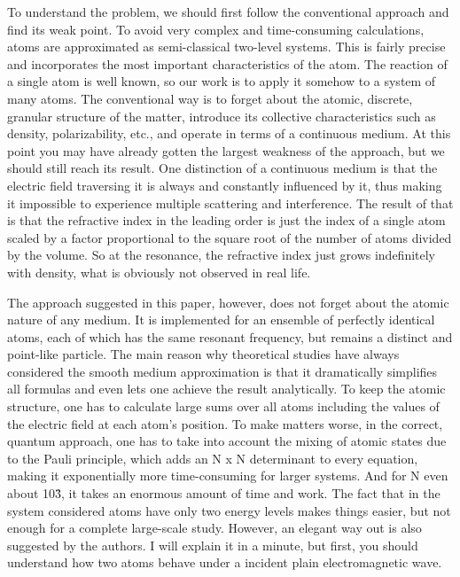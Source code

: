 \documentclass[a4paper, 12pt]{article}
\begin{document}
To understand the problem, we should first follow the conventional 
approach and find its weak point. To avoid very complex and 
time-consuming calculations, atoms are approximated as semi-classical 
two-level systems. This is fairly precise and incorporates the most 
important characteristics of the atom. The reaction of a single atom is 
well known, so our work is to apply it somehow to a system of many 
atoms. The conventional way is to forget about the atomic, discrete, 
granular structure of the matter, introduce its collective 
characteristics such as density, polarizability, etc., and operate in 
terms of a continuous medium. At this point you may have already gotten 
the largest weakness of the approach, but we should still reach its 
result. One distinction of a continuous medium is that the electric 
field traversing it is always and constantly influenced by it, thus 
making it impossible to experience multiple scattering and interference. 
The result of that is that the refractive index in the leading order is 
just the index of a single atom scaled by a factor proportional to the 
square root of the number of atoms divided by the volume. So at the 
resonance, the refractive index just grows indefinitely with density, 
what is obviously not observed in real life.

The approach suggested in this paper, however, does not forget about the 
atomic nature of any medium. It is implemented for an ensemble of 
perfectly identical atoms, each of which has the same resonant 
frequency, but remains a distinct and point-like particle. The main 
reason why theoretical studies have always considered the smooth medium 
approximation is that it dramatically simplifies all formulas and even 
lets one achieve the result analytically. To keep the atomic structure, 
one has to calculate large sums over all atoms including the values of 
the electric field at each atom's position. To make matters worse, in 
the correct, quantum approach, one has to take into account the mixing 
of atomic states due to the Pauli principle, which adds an 
N x N determinant to every equation, making it exponentially more 
time-consuming for larger systems. And for N even about 10\^3, it takes 
an enormous amount of time and work. The fact that in the system 
considered atoms have only two energy levels makes things easier, but 
not enough for a complete large-scale study. However, an elegant way out 
is also suggested by the authors. I will explain it in a minute, but 
first, you should understand how two atoms behave under a incident plain 
electromagnetic wave.
\end{document}
